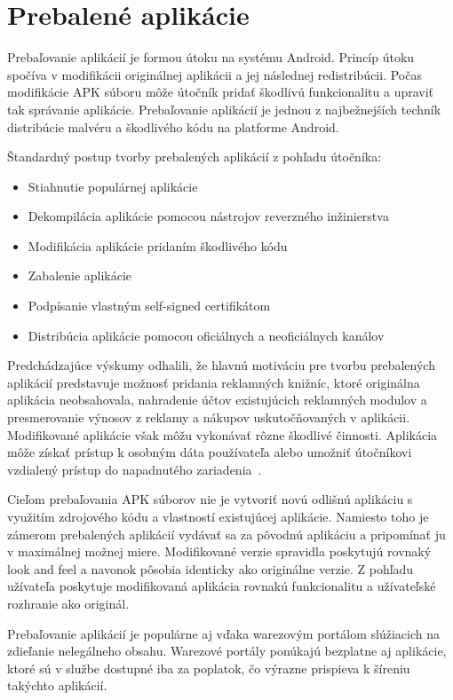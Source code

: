 \chapter{Prebalené aplikácie}
Prebaľovanie aplikácií je formou útoku na systému Android. Princíp útoku spočíva v modifikácii originálnej aplikácii a jej následnej redistribúcii. Počas modifikácie APK súboru môže útočník pridať škodlivú funkcionalitu a upraviť tak správanie aplikácie.
Prebaľovanie aplikácií je jednou z najbežnejších techník distribúcie malvéru a škodlivého kódu na platforme Android. 

Štandardný postup tvorby prebalených aplikácií z pohľadu útočníka:
\begin{itemize}
	\item Stiahnutie populárnej aplikácie
	\item Dekompilácia aplikácie pomocou nástrojov reverzného inžinierstva
	\item Modifikácia aplikácie pridaním škodlivého kódu
	\item Zabalenie aplikácie
	\item Podpísanie vlastným self-signed certifikátom
	\item Distribúcia aplikácie pomocou oficiálnych a neoficiálnych kanálov 
\end{itemize}

Predchádzajúce výskumy odhalili, že hlavnú motiváciu pre tvorbu prebalených aplikácií predstavuje možnosť pridania reklamných knižníc, ktoré originálna aplikácia neobsahovala, nahradenie účtov existujúcich reklamných modulov a presmerovanie výnosov z reklamy a nákupov uskutočňovaných v aplikácii. Modifikované aplikácie však môžu vykonávať rôzne škodlivé činnosti. Aplikácia môže získať prístup k osobným dáta používateľa alebo umožniť útočníkovi vzdialený prístup do napadnutého zariadenia~\cite{DetectingRepackagedZhou, Zhou2012}.

Cieľom prebaľovania APK súborov nie je vytvoriť novú odlišnú aplikáciu s využitím zdrojového kódu a vlastností existujúcej aplikácie. Namiesto toho je zámerom prebalených aplikácií vydávať sa za pôvodnú aplikáciu a pripomínať ju v maximálnej možnej miere. Modifikované verzie spravidla poskytujú rovnaký look and feel a navonok pôsobia identicky ako originálne verzie. Z pohľadu užívateľa poskytuje modifikovaná aplikácia rovnakú funkcionalitu a užívateľské rozhranie ako originál. 

Prebaľovanie aplikácií je populárne aj vďaka warezovým portálom slúžiacich na zdieľanie nelegálneho obsahu. Warezové portály ponúkajú bezplatne aj aplikácie, ktoré sú v službe  dostupné iba za poplatok, čo výrazne prispieva k šíreniu takýchto aplikácií. 

